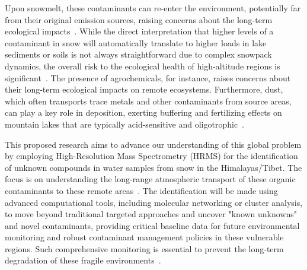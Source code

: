 \documentclass[11pt]{article}
\begin{document}
\begin{doublespace}
        Upon snowmelt, these contaminants can re-enter the environment, potentially far from their original emission sources, raising concerns about the long-term ecological impacts~\cite{Wenkai}.
        While the direct interpretation that higher levels of a contaminant in snow will automatically translate to higher loads in lake sediments or soils is not always straightforward due to complex snowpack dynamics, the overall risk to the ecological health of high-altitude regions is significant~\cite{Catalan}.
        The presence of agrochemicals, for instance, raises concerns about their long-term ecological impacts on remote ecosystems.
        Furthermore, dust, which often transports trace metals and other contaminants from source areas, can play a key role in deposition, exerting buffering and fertilizing effects on mountain lakes that are typically acid-sensitive and oligotrophic~\cite{Catalan}.

        This proposed research aims to advance our understanding of this global problem by employing High-Resolution Mass Spectrometry (HRMS) for the identification of unknown compounds in water samples from snow in the Himalayas/Tibet.
        The focus is on understanding the long-range atmospheric transport of these organic contaminants to these remote areas~\cite{Wenkai}.
        The identification will be made using advanced computational tools, including molecular networking or cluster analysis, to move beyond traditional targeted approaches and uncover "known unknowns" and novel contaminants, providing critical baseline data for future environmental monitoring and robust contaminant management policies in these vulnerable regions.
        Such comprehensive monitoring is essential to prevent the long-term degradation of these fragile environments~\cite{Wenkai}.


\end{doublespace}
\end{document}
